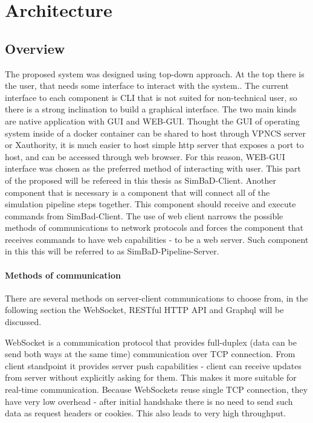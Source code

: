 \chapter{Architecture}
\section{Overview}
The proposed system was designed using top-down approach. At the top there is the user, that needs some interface to interact with the system.. The current interface to each component is CLI that is not suited for non-technical user, so there is a strong inclination to build a graphical interface. The two main kinds are native application with GUI and WEB-GUI. Thought the GUI of operating system inside of a docker container can be shared to host through VPNCS server or Xauthority, it is much easier to host simple http server that exposes a port to host, and can be accessed through web browser. For this reason, WEB-GUI interface was chosen as the preferred method of interacting with user. This part of the proposed will be refereed in this thesis as SimBaD-Client.
Another component that is necessary is a component that will connect all of the simulation pipeline steps together. This component should receive and execute commands from SimBad-Client. The use of web client narrows the possible methods of communications to network protocols and forces the component that receives commands to have web capabilities - to be a web server. Such component in this this will be referred to as SimBaD-Pipeline-Server. 
\subsubsection{Methods of communication}
There are several methods on server-client communications to choose from, in the following section the WebSocket, RESTful HTTP API and Graphql will be discussed.

WebSocket is a communication protocol that provides full-duplex (data can be send both ways at the same time) communication over TCP connection. From client standpoint it provides server push capabilities - client can receive updates from server without explicitly asking for them. This makes it more suitable for real-time communication. Because WebSockets reuse single TCP connection, they have very low overhead - after initial handshake there is no need to send such data as request headers or cookies. This also leads to very high throughput. 

